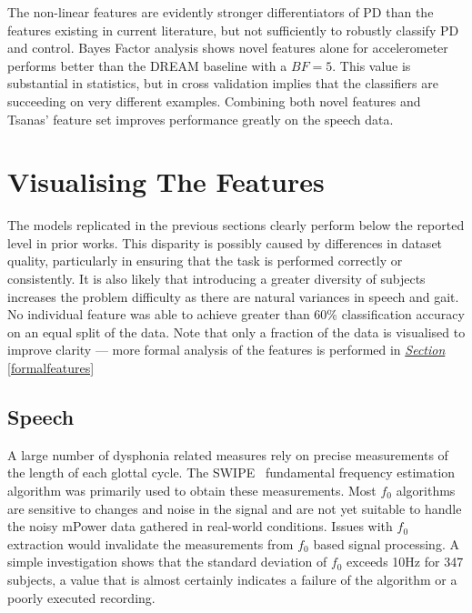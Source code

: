 \documentclass[12pt, twoside]{book}
\begin{document}
The non-linear features are evidently stronger differentiators of PD than the features existing in current literature, but not sufficiently to robustly classify PD and control. Bayes Factor analysis shows novel features alone for accelerometer performs better than the DREAM baseline with a $BF=5$. This value is substantial in statistics, but in cross validation implies that the classifiers are succeeding on very different examples. Combining both novel features and Tsanas' feature set improves performance greatly on the speech data.

\section{Visualising The Features}
\label{visfeature}
The models replicated in the previous sections clearly perform below the reported level in prior works. This disparity is possibly caused by differences in dataset quality, particularly in ensuring that the task is performed correctly or consistently. It is also likely that introducing a greater diversity of subjects increases the problem difficulty as there are natural variances in speech and gait. No individual feature was able to achieve greater than 60\% classification accuracy on an equal split of the data. Note that only a fraction of the data is visualised to improve clarity --- more formal analysis of the features is performed in \textit{\hyperref[formalfeatures]{Section}} \ref{formalfeatures}

\subsection{Speech}
A large number of dysphonia related measures rely on precise measurements of the length of each glottal cycle. The SWIPE~\cite{camacho2007swipe} fundamental frequency estimation algorithm was primarily used to obtain these measurements. Most $f_0$ algorithms are sensitive to changes and noise in the signal and are not yet suitable to handle the noisy mPower data gathered in real-world conditions. Issues with $f_0$ extraction would invalidate the measurements from $f_0$ based signal processing. A simple investigation shows that the standard deviation of $f_0$ exceeds 10Hz for 347 subjects, a value that is almost certainly indicates a failure of the algorithm or a poorly executed recording.
\end{document}
